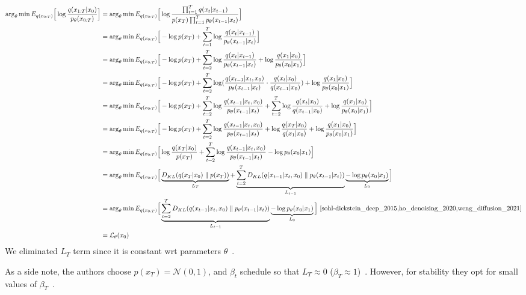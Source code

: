\documentclass{book}
\numberwithin{equation}{subsection}
\begin{document}
\begin{align}
\arg_\theta \min E_{q(x_{0:T})}\Big[\log\frac{q(x_{1:T}|x_0)}{p_\theta(x_{0:T})}\Big] &= \arg_\theta \min E_{q(x_{0:T})}\Big[ \log\frac{\prod_{t=1}^T q(x_t|x_{t-1})}{ p(x_T) \prod_{t=1}^T p_\theta(x_{t-1} |x_t) }\Big] \\
&= \arg_\theta \min E_{q(x_{0:T})}\Big[ -\log p(x_T) + \sum_{t=1}^T \log \frac{q(x_t|x_{t-1})}{p_\theta(x_{t-1} |x_t)}\Big] \\
&= \arg_\theta \min E_{q(x_{0:T})}\Big[ -\log p(x_T) + \sum_{t=2}^T \log \frac{q(x_t|x_{t-1})}{p_\theta(x_{t-1} |x_t)} + \log\frac{q(x_1 |x_0)}{p_\theta(x_0 |x_1)}\Big]\\
&= \arg_\theta \min E_{q(x_{0:T})}\Big[ -\log p(x_T) + \sum_{t=2}^T \log ( \frac{q(x_{t-1} |x_t, x_0)}{p_\theta(x_{t-1} |x_t)}\cdot \frac{q(x_t |x_0)}{q(x_{t-1}|x_0)} ) + \log \frac{q(x_1 |x_0)}{p_\theta(x_0 |x_1)} \Big]\label{x0cond}\\
&= \arg_\theta \min E_{q(x_{0:T})}\Big[ -\log p(x_T) + \sum_{t=2}^T \log \frac{q(x_{t-1} |x_t, x_0)}{p_\theta(x_{t-1} |x_t)} + \sum_{t=2}^T \log \frac{q(x_t |x_0)}{q(x_{t-1} |x_0)} + \log\frac{q(x_1 |x_0)}{p_\theta(x_0 |x_1)}\Big] \\
&= \arg_\theta \min E_{q(x_{0:T})}\Big[-\log p(x_T) + \sum_{t=2}^T \log \frac{q(x_{t-1} |x_t, x_0)}{p_\theta(x_{t-1} |x_t)} + \log\frac{q(x_T |x_0)}{q(x_1 |x_0)} + \log \frac{q(x_1 |x_0)}{p_\theta(x_0 |x_1)}\Big]\\
&= \arg_\theta \min E_{q(x_{0:T})}\Big[\log\frac{q(x_T |x_0)}{p(x_T)} + \sum_{t=2}^T \log \frac{q(x_{t-1} |x_t, x_0)}{p_\theta(x_{t-1} |x_t)} - \log p_\theta(x_0 |x_1)\Big] \\
&= \arg_\theta \min E_{q(x_{0:T})}\Big[\underbrace{D_{KL}(q(x_T |x_0) \parallel p(x_T))}_{L_T} + \underbrace{\sum_{t=2}^T D_{KL}(q(x_{t-1} |x_t, x_0) \parallel p_\theta(x_{t-1} |x_t))}_{L_{t-1}} \underbrace{- \log p_\theta(x_0 |x_1)}_{L_0}\Big]\\
&= \arg_\theta \min E_{q(x_{0:T})}\Big[\underbrace{\sum_{t=2}^T D_{KL}(q(x_{t-1} |x_t, x_0) \parallel p_\theta(x_{t-1} |x_t))}_{L_{t-1}} \underbrace{- \log p_\theta(x_0 |x_1)}_{L_0}\Big]~\cite{sohl-dickstein_deep_2015,ho_denoising_2020,weng_diffusion_2021}\\
&= \mathcal{L}_\theta(x_0)
\end{align}
We eliminated $L_T$ term since it is constant wrt parameters $\theta$~\cite{weng_diffusion_2021}.

As a side note, the authors choose $p(x_T)=\mathcal{N}(0,1)$, and $\beta_t$ schedule so that $L_T \approx 0$ ($\beta_T \approx 1$)~\cite{ho_denoising_2020}. However, for stability they opt for small values of $\beta_T$~\cite{sohl-dickstein_deep_2015, ho_denoising_2020}.
\end{document}
